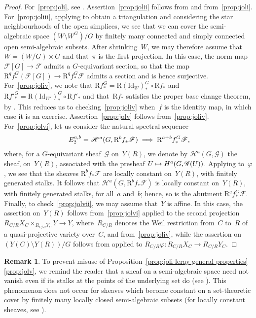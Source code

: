 \documentclass[JEP,XML,SOM,Unicode]{cedram}
\newcommand\mto{\mathchoice{\longmapsto}{\mapsto}{\mapsto}{\mapsto}}
\newcommand\implique{\mathchoice{\implies}{\Rightarrow}{\Rightarrow}{\Rightarrow}}
\theoremstyle{plain}
\theoremstyle{definition}
\newtheorem{rmk}[thm]{Remark}
\numberwithin{equation}{section}
\newcommand{\sH}{{\mathscr H}}
\newcommand{\sF}{{\mathscr F}}
\newcommand{\sG}{{\mathscr G}}
\renewcommand{\phi}{\varphi}
\newcommand{\RR}{{\mathrm{R}}}
\begin{document}
\begin{proof}
For~\eqref{prop:joli}, see \cite[Lemme~3.7.2]{tohoku}.
Assertion~\eqref{prop:jolii} follows from \cite[(\ref*{BW1-eq:cohoeqnoneq})]{BW1}
and from~\eqref{prop:joli}.
For~\eqref{prop:joliii},
applying \cite[Th.\,2.1]{delfsknebuschonthehomology} to obtain a triangulation
and considering the star neighbourhoods of the open simplices,
we see that we can cover the semi-algebraic space $(W\setminus W^G)/G$
by finitely many connected and simply connected open semi-algebraic subsets.
After shrinking~$W$, we may therefore assume that $W=(W/G) \times G$
and that~$\pi$ is the first projection.
In this case, the norm map $\sF[G]\to \sF$ admits a $G$\nobreakdash-equivariant section,
so that the map
$\RR^qf^G_*(\sF[G]) \to \RR^qf^G_*\sF$
admits a section
and is hence surjective.
For~\eqref{prop:joliv}, we note that $\RR f^G_* = \RR (\mathrm{Id}_W)_*^G\circ \RR f_*$
and $\RR f'^G_* = \RR (\mathrm{Id}_{W'})_*^G\circ \RR f'_*$
and that~$\RR f_*$ satisfies the proper base change theorem,
by \cite[Ch.\,II, Th.\,7.8]{delfshomology}.
This reduces us to checking~\eqref{prop:joliv} when~$f$ is the identity map,
in which case it is an exercise.
Assertion~\eqref{prop:jolv} follows from~\eqref{prop:joliv}.
For~\eqref{prop:jolvi},
let us consider the natural spectral sequence
\[
E_2^{a,b}=\sH^a(G,\RR^b f_*\sF) \implique \RR^{a+b} f^G_* \sF\rlap{,}
\]
where, for a $G$\nobreakdash-equivariant sheaf~$\sG$ on~$Y(R)$,
we denote by $\sH^a(G,\sG)$ the sheaf, on~$Y(R)$,
associated with the presheaf $U \mto H^a(G,\sG(U))$.
Applying \cite[Cor.\,17.20]{scheiderer} to~$\phi$,
we see that the sheaves $\RR^b f_*\sF$ are locally constant on~$Y(R)$, with finitely generated stalks.
It follows that $\sH^a(G,\RR^b f_*\sF)$ is locally constant on~$Y(R)$, with finitely generated stalks,
for all~$a$ and~$b$; hence, so is the abutment $\RR^q f^G_*\sF$.
Finally, to check~\eqref{prop:jolvii}, we may assume that~$Y$ is affine.
In this case, the assertion on~$Y(R)$ follows from~\eqref{prop:jolvi} applied to
the second projection $R_{C/R} X_C \times_{R_{C/R} Y_C} Y \to Y$,
where~$R_{C/R}$ denotes the Weil restriction from~$C$ to~$R$
of a quasi-projective variety over~$C$,
and from~\eqref{prop:joliv},
while the assertion on $(Y(C)\setminus Y(R))/G$ follows from
\cite[Cor.\,17.20]{scheiderer}
applied to $R_{C/R}\phi:R_{C/R}X_C \to R_{C/R}Y_C$.
\end{proof}

\begin{rmk}
\label{rmk:warning stalks}
To prevent misuse of Proposition~\ref{prop:joli leray general properties}\,\eqref{prop:jolv},
we remind the reader that a sheaf on a semi-algebraic space need not vanish even if its stalks
at the points of the underlying set
do (see \cite[Ch.\,I, Ex.\,1.7]{delfshomology}).
This phenomenon does not occur for sheaves
which become constant on a set-theoretic cover by finitely many locally closed semi-algebraic subsets
(\eg for locally constant sheaves, see \cite[Ch.\,II, Def.\,1]{delfshomology}).
\end{rmk}
\end{document}
